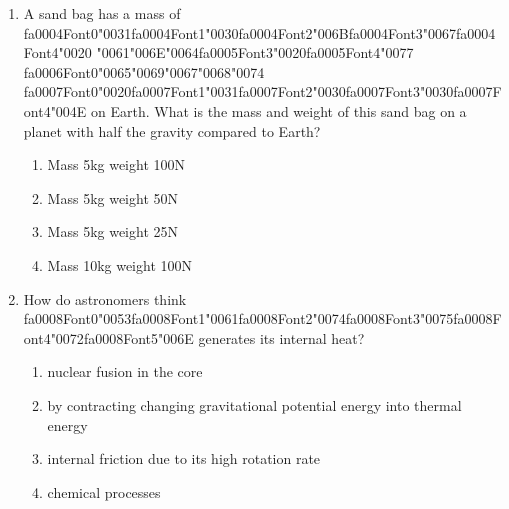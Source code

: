 \documentclass[12pt]{article}
\begin{document}
\begin{enumerate}[label=\arabic*.]
\begin{enumerate}[label=(\alph*)]
    \item Power emitted is 1/4 times as high; peak emission wavelength is 2 times longer.
    \item Power emitted is 1/4 times as high; peak emission wavelength is 1/2 as long.
    \item Power emitted is 1/16 times as high; peak emission wavelength is 2 times longer.
\end{enumerate}
\item A sand bag has a mass of {\csname fa0004Font0\endcsname\char"0031}{\csname fa0004Font1\endcsname\char"0030}{\csname fa0004Font2\endcsname\char"006B}{\csname fa0004Font3\endcsname\char"0067}{\csname fa0004Font4\endcsname\char"0020} {\char"0061}{\char"006E}{\char"0064}{\csname fa0005Font3\endcsname\char"0020}{\csname fa0005Font4\endcsname\char"0077} {\csname fa0006Font0\endcsname\char"0065}{\char"0069}{\char"0067}{\char"0068}{\char"0074} {\csname fa0007Font0\endcsname\char"0020}{\csname fa0007Font1\endcsname\char"0031}{\csname fa0007Font2\endcsname\char"0030}{\csname fa0007Font3\endcsname\char"0030}{\csname fa0007Font4\endcsname\char"004E} on Earth. What is the mass and weight of this
sand bag on a planet with half the gravity compared to Earth?
\begin{enumerate}[label=(\alph*)]
    \item Mass 5kg weight 100N
    \item Mass 5kg weight 50N
    \item Mass 5kg weight 25N
    \item Mass 10kg weight 100N
\end{enumerate}
\item How do astronomers think {\csname fa0008Font0\endcsname\char"0053}{\csname fa0008Font1\endcsname\char"0061}{\csname fa0008Font2\endcsname\char"0074}{\csname fa0008Font3\endcsname\char"0075}{\csname fa0008Font4\endcsname\char"0072}{\csname fa0008Font5\endcsname\char"006E} generates its internal heat?
\begin{enumerate}[label=(\alph*)]
    \item nuclear fusion in the core
    \item by contracting changing gravitational potential energy into thermal energy
    \item internal friction due to its high rotation rate
    \item chemical processes
\end{enumerate}
\end{enumerate}
\end{document}
